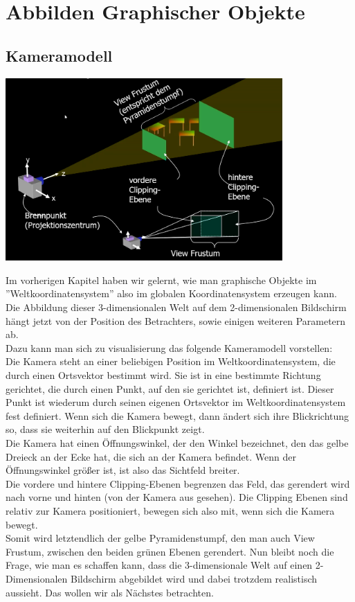 \newpage
\section{Abbilden Graphischer Objekte}

\subsection{Kameramodell}

\includegraphics[width=400px]{images/kameramodell.png}

\vspace{10px}

Im vorherigen Kapitel haben wir gelernt, wie man graphische Objekte im ''Weltkoordinatensystem'' also im globalen Koordinatensystem erzeugen kann. Die Abbildung dieser 3-dimensionalen Welt auf dem 2-dimensionalen Bildschirm hängt jetzt von der Position des Betrachters, sowie einigen weiteren Parametern ab.\\
Dazu kann man sich zu visualisierung das folgende Kameramodell vorstellen:\\
Die Kamera steht an einer beliebigen Position im Weltkoordinatensystem, die durch einen Ortsvektor bestimmt wird. Sie ist in eine bestimmte Richtung gerichtet, die durch einen Punkt, auf den sie gerichtet ist, definiert ist. Dieser Punkt ist wiederum durch seinen eigenen Ortsvektor im Weltkoordinatensystem fest definiert. Wenn sich die Kamera bewegt, dann ändert sich ihre Blickrichtung so, dass sie weiterhin auf den Blickpunkt zeigt.\\
Die Kamera hat einen Öffnungswinkel, der den Winkel bezeichnet, den das gelbe Dreieck an der Ecke hat, die sich an der Kamera befindet. Wenn der Öffnungswinkel größer ist, ist also das Sichtfeld breiter.\\
Die vordere und hintere Clipping-Ebenen begrenzen das Feld, das gerendert wird nach vorne und hinten (von der Kamera aus gesehen). Die Clipping Ebenen sind relativ zur Kamera positioniert, bewegen sich also mit, wenn sich die Kamera bewegt.\\
Somit wird letztendlich der gelbe Pyramidenstumpf, den man auch View Frustum, zwischen den beiden grünen Ebenen gerendert. Nun bleibt noch die Frage, wie man es schaffen kann, dass die 3-dimensionale Welt auf einen 2-Dimensionalen Bildschirm abgebildet wird und dabei trotzdem realistisch aussieht. Das wollen wir als Nächstes betrachten.

